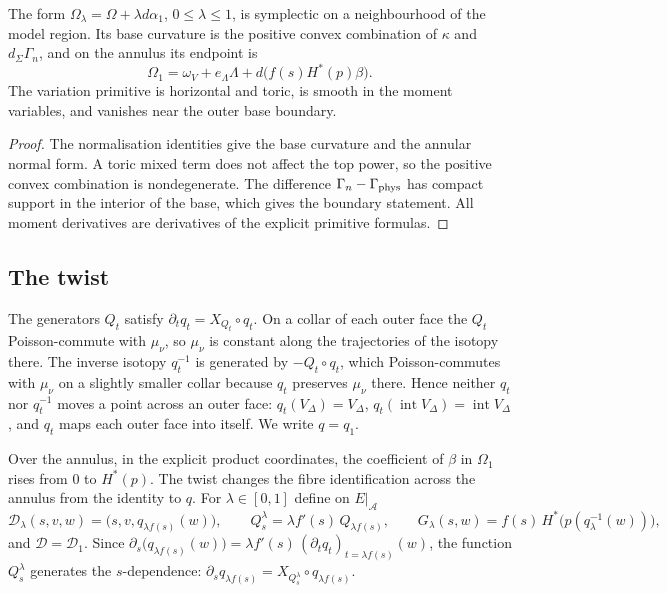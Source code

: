 \begin{proposition}\label{prop:hdl-first-path}
The form $\Omega_\lambda=\Omega+\lambda d\alpha_1$, $0\le\lambda\le1$, is symplectic on a
neighbourhood of the model region. Its base curvature is the positive convex combination of
$\kappa$ and $d_\Sigma\Gamma_n$, and on the annulus its endpoint is
\[
 \Omega_1=\omega_V+e_\Lambda\Lambda+d\big(f(s)H^*(p)\beta\big).
\]
The variation primitive is horizontal and toric, is smooth in the moment variables, and vanishes
near the outer base boundary.
\end{proposition}
\begin{proof}
The normalisation identities give the base curvature and the annular normal form. A toric mixed term
does not affect the top power, so the positive convex combination is nondegenerate. The difference
$\Gamma_n-\Gamma_{\rm phys}$ has compact support in the interior of the base, which gives the boundary
statement. All moment derivatives are derivatives of the explicit primitive formulas.
\end{proof}

\subsection{The twist}\label{sec:hdl-twist}

The generators $Q_t$ satisfy $\partial_tq_t=X_{Q_t}\circ q_t$. On a collar of each outer face the $Q_t$
Poisson-commute with $\mu_\nu$, so $\mu_\nu$ is constant along the trajectories of the isotopy there. The inverse
isotopy $q_t^{-1}$ is generated by $-Q_t\circ q_t$, which Poisson-commutes with $\mu_\nu$ on a slightly smaller collar
because $q_t$ preserves $\mu_\nu$ there. Hence neither $q_t$ nor $q_t^{-1}$ moves a point across an outer face:
$q_t(V_\Delta)=V_\Delta$, $q_t(\operatorname{int}V_\Delta)=\operatorname{int}V_\Delta$, and $q_t$ maps each outer face into
itself. We write $q=q_1$.

Over the annulus, in the explicit product coordinates, the coefficient of $\beta$ in $\Omega_1$
rises from $0$ to $H^*(p)$. The twist changes the fibre identification across the annulus from the identity to $q$.
For $\lambda\in[0,1]$ define on $E|_{\mathcal A}$
\begin{equation}\label{eq:hdl-twist}
 \mathcal D_\lambda(s,v,w)=\big(s,v,q_{\lambda f(s)}(w)\big),\qquad
 Q^\lambda_s=\lambda f'(s)\,Q_{\lambda f(s)},\qquad
 G_\lambda(s,w)=f(s)\,H^*\big(p(q_\lambda^{-1}(w))\big),
\end{equation}
and $\mathcal D=\mathcal D_1$. Since $\partial_s\big(q_{\lambda f(s)}(w)\big)=\lambda f'(s)\,(\partial_tq_t)_{t=\lambda f(s)}(w)$, the
function $Q^\lambda_s$ generates the $s$-dependence: $\partial_sq_{\lambda f(s)}=X_{Q^\lambda_s}\circ q_{\lambda f(s)}$.

